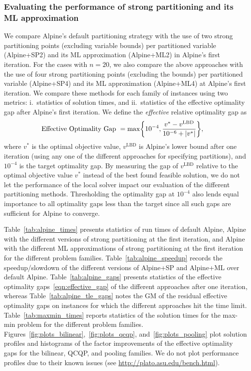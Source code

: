 \documentclass{article}
\newcommand{\pp}{partitioning points}
\DeclarePairedDelimiter\abs{\lvert}{\rvert}%
\begin{document}
\subsubsection{Evaluating the performance of strong partitioning and its ML approximation}


We compare Alpine's default partitioning strategy with the use of two strong {\pp} (excluding variable bounds) per partitioned variable (Alpine+SP2) and its ML approximation (Alpine+ML2) in Alpine's first iteration.
For the cases with $n=20$, we also compare the above approaches with the use of four strong {\pp} (excluding the bounds) per partitioned variable (Alpine+SP4) and its ML approximation (Alpine+ML4)  at Alpine's first iteration.
We compare these methods for each family of instances using two metrics: i.\ statistics of solution times, and ii.\ statistics of the effective optimality gap after Alpine's first iteration.
We define the \textit{effective} relative optimality gap as
\begin{align}
\label{eqn:effective_gap}
\text{Effective Optimality Gap } &= \max \biggl\{ 10^{-4}, \frac{v^* - v^{\text{LBD}}}{10^{-6} + \abs{v^*}} \biggr\},
\end{align}
where $v^*$ is the optimal objective value, $v^{\text{LBD}}$ is Alpine's lower bound after one iteration (using any one of the different approaches for specifying partitions), and $10^{-4}$ is the target optimality gap.
By measuring the gap of $v^{\text{LBD}}$ relative to the optimal objective value $v^*$ instead of the best found feasible solution, we do not let the performance of the local solver impact our evaluation of the different partitioning methods.
Thresholding the optimality gap at $10^{-4}$ also lends equal importance to all optimality gaps less than the target since all such gaps are sufficient for Alpine to converge.



Table~\ref{tab:alpine_times} presents statistics of run times of default Alpine, Alpine with the different versions of strong partitioning at the first iteration, and Alpine with the different ML approximations of strong partitioning at the first iteration for the different problem families.
Table~\ref{tab:alpine_speedup} records the speedup/slowdown of the different versions of Alpine+SP and Alpine+ML over default Alpine. 
Table~\ref{tab:alpine_gaps} presents statistics of the effective optimality gaps~\eqref{eqn:effective_gap} of the different approaches after one iteration, whereas Table~\ref{tab:alpine_tle_gaps} notes the GM of the residual effective optimality gaps on instances for which the different approaches hit the time limit.
Table~\ref{tab:maxmin_times} reports statistics of the solution times for the max-min problem for the different problem families.
Figures~\ref{fig:plots_bilinear},~\ref{fig:plots_qcqp}, and~\ref{fig:plots_pooling} plot solution profiles and histograms of the factor improvements of the effective optimality gaps 
for the bilinear, QCQP, and pooling families.
We do not plot performance profiles due to their known issues (see \url{http://plato.asu.edu/bench.html}).
\end{document}
